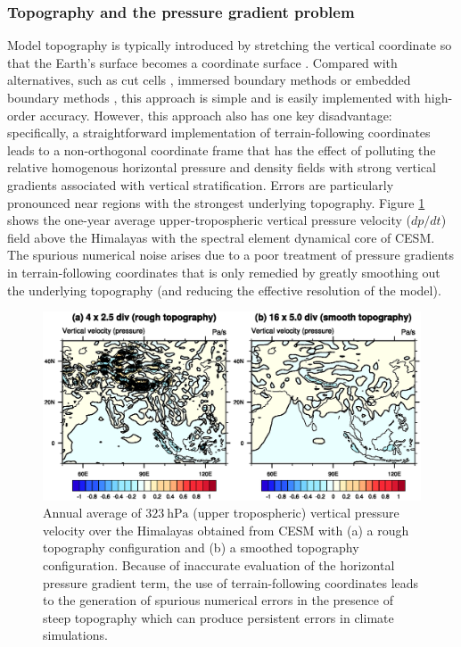 \documentclass[11pt]{article}
\begin{document}
\subsubsection{Topography and the pressure gradient problem} \label{sec:TopographyPGF}

Model topography is typically introduced by stretching the vertical coordinate so that the Earth's surface becomes a coordinate surface \citep{TGCRCJS1975JCP, schar2002new}.  Compared with alternatives, such as cut cells \citep{causon2000calculation, ingram2003developments}, immersed boundary methods \citep{mittal2005immersed} or embedded boundary methods \citep{johansen1998cartesian, wang2011algorithms}, this approach is simple and is easily implemented with high-order accuracy.  However, this approach also has one key disadvantage:  specifically, a straightforward implementation of terrain-following coordinates leads to a non-orthogonal coordinate frame that has the effect of polluting the relative homogenous horizontal pressure and density fields with strong vertical gradients associated with vertical stratification.  Errors are particularly pronounced near regions with the strongest underlying topography.  Figure \ref{fig:OmegaNoise} shows the one-year average upper-tropospheric vertical pressure velocity ($dp/dt$) field above the Himalayas with the spectral element dynamical core of CESM.  The spurious numerical noise arises due to a poor treatment of pressure gradients in terrain-following coordinates that is only remedied by greatly smoothing out the underlying topography (and reducing the effective resolution of the model).

\begin{figure}
\begin{center}
\includegraphics[width=5in, clip=true, trim=0cm 5.1cm 0cm 4.6cm]{OmegaNoise.eps}
\end{center}
\caption{Annual average of $323\ \mbox{hPa}$ (upper tropospheric) vertical pressure velocity over the Himalayas obtained from CESM with (a) a rough topography configuration and (b) a smoothed topography configuration. Because of inaccurate evaluation of the horizontal pressure gradient term, the use of terrain-following coordinates leads to the generation of spurious numerical errors in the presence of steep topography which can produce persistent errors in climate simulations.} \label{fig:OmegaNoise}
\end{figure}
\end{document}
